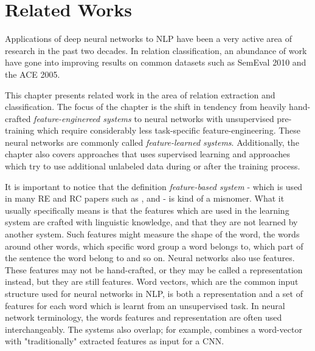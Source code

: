 
\chapter{Related Works}
\label{chap:related_works}

Applications of deep neural networks to NLP have been a very active area of research in the past two decades. In relation classification, an abundance of work have gone into improving results on common datasets such as SemEval 2010 and the ACE 2005. 

This chapter presents related work in the area of relation extraction and classification. The focus of the chapter is the shift in tendency from heavily hand-crafted \emph{feature-enginereed systems} to neural networks with unsupervised pre-training which require considerably less task-specific feature-engineering. These neural networks are commonly called \emph{feature-learned systems}. Additionally, the chapter also covers approaches that uses supervised learning and approaches which try to use additional unlabeled data during or after the training process.  

It is important to notice that the definition \emph{feature-based system} -  which is used in many RE and RC papers such as \citep{re_cnn}, \citep{re_survey} and \citep{re_lstm} - is kind of a misnomer. What it usually specifically means is that the features which are used in the learning system are crafted with linguistic knowledge, and that they are not learned by another system. Such features might measure the shape of the word, the words around other words, which specific word group a word belongs to, which part of the sentence the word belong to and so on. Neural networks also use features. These features may not be hand-crafted, or they may be called a representation instead, but they are still features. Word vectors, which are the common input structure used for neural networks in NLP, is both a representation and a set of features for each word which is learnt from an unsupervised task. In neural network terminology, the words features and representation are often used interchangeably. The systems also overlap; for example, \citep{zeng2014} combines a word-vector with "traditionally" extracted features as input for a CNN.


 




